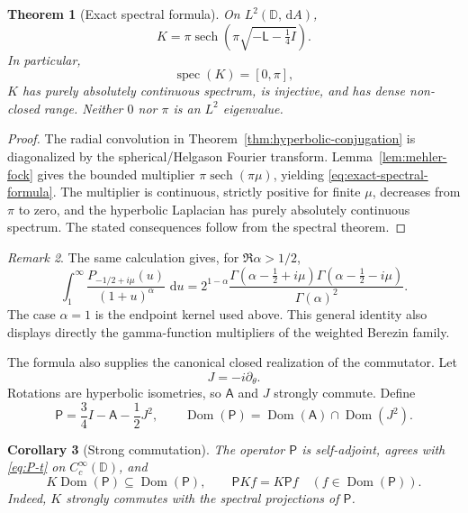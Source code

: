 \IfFileExists{iopjournal.cls}{\documentclass{iopjournal}}{\documentclass{iopjournal-draft}}
\newtheorem{theorem}{Theorem}[section]
\newtheorem{corollary}[theorem]{Corollary}
\theoremstyle{definition}
\theoremstyle{remark}
\newtheorem{remark}[theorem]{Remark}
\newcommand{\D}{\mathbb D}
\newcommand{\dd}{\,\mathrm d}
\newcommand{\sech}{\operatorname{sech}}
\newcommand{\Dom}{\operatorname{Dom}}
\newcommand{\spec}{\operatorname{spec}}
\numberwithin{equation}{section}
\begin{document}
\begin{theorem}[Exact spectral formula]
\label{thm:spectral-formula}
On $L^2(\D,\dd A)$,
\begin{equation}
 K=\pi\sech\!\left(\pi\sqrt{-\mathsf L-\tfrac14I}\right).
 \label{eq:exact-spectral-formula}
\end{equation}
In particular,
\begin{equation}
 \spec(K)=[0,\pi],
 \label{eq:spectrum-K}
\end{equation}
$K$ has purely absolutely continuous spectrum, is injective, and has dense non-closed range.  Neither $0$ nor $\pi$ is an $L^2$ eigenvalue.
\end{theorem}

\begin{proof}
The radial convolution in Theorem~\ref{thm:hyperbolic-conjugation} is diagonalized by the spherical/Helgason Fourier transform.  Lemma~\ref{lem:mehler-fock} gives the bounded multiplier $\pi\sech(\pi\mu)$, yielding \eqref{eq:exact-spectral-formula}.  The multiplier is continuous, strictly positive for finite $\mu$, decreases from $\pi$ to zero, and the hyperbolic Laplacian has purely absolutely continuous spectrum.  The stated consequences follow from the spectral theorem.
\end{proof}

\begin{remark}
	The same calculation gives, for $\Re\alpha>1/2$,
	\[
	\int_1^\infty
	\frac{P_{-1/2+i\mu}(u)}{(1+u)^\alpha}\,\dd u
	=
	2^{1-\alpha}
	\frac{
		\Gamma(\alpha-\frac12+i\mu)
		\Gamma(\alpha-\frac12-i\mu)
	}{\Gamma(\alpha)^2}.
	\]
	The case $\alpha=1$ is the endpoint kernel used above.  This
	general identity also displays directly the gamma-function multipliers
	of the weighted Berezin family.
\end{remark}

The formula also supplies the canonical closed realization of the commutator.  Let
\begin{equation}
 J=-i\partial_\theta.
 \label{eq:J}
\end{equation}
Rotations are hyperbolic isometries, so $\mathsf A$ and $J$ strongly commute.  Define
\begin{equation}
 \mathsf P=\frac34I-\mathsf A-\frac12J^2,
 \qquad
 \Dom(\mathsf P)=\Dom(\mathsf A)\cap\Dom(J^2).
 \label{eq:P-operator}
\end{equation}

\begin{corollary}[Strong commutation]
\label{cor:strong-commutation}
The operator $\mathsf P$ is self-adjoint, agrees with \eqref{eq:P-t} on $C_c^\infty(\D)$, and
\begin{equation}
 K\Dom(\mathsf P)\subseteq\Dom(\mathsf P),
 \qquad
 \mathsf P Kf=K\mathsf P f
 \quad(f\in\Dom(\mathsf P)).
 \label{eq:strong-commutation}
\end{equation}
Indeed, $K$ strongly commutes with the spectral projections of $\mathsf P$.
\end{corollary}
\end{document}
